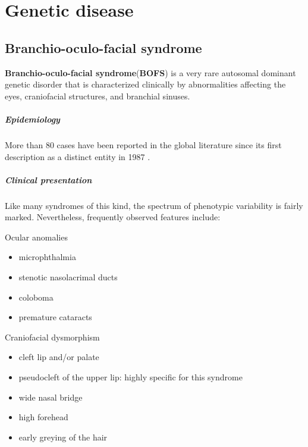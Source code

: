 \chapter{Genetic disease}
\section{Branchio-oculo-facial syndrome}

\textbf{Branchio-oculo-facial syndrome}(\textbf{BOFS}) is a very rare autosomal dominant genetic disorder that is characterized clinically by abnormalities affecting the eyes, craniofacial structures, and branchial sinuses.

\paragraph{Epidemiology}

More than 80 cases have been reported in the global literature since its first description as a distinct entity in 1987 .

\paragraph{Clinical presentation}

Like many syndromes of this kind, the spectrum of phenotypic variability is fairly marked. Nevertheless, frequently observed features include:

Ocular anomalies

\begin{itemize}
	\tightlist
	\item
	microphthalmia
	\item
	stenotic nasolacrimal ducts
	\item
	coloboma
	\item
	premature cataracts
\end{itemize}

Craniofacial dysmorphism

\begin{itemize}
	\tightlist
	\item
	cleft lip and/or palate
	\item
	pseudocleft of the upper lip: highly specific for this syndrome
	\item
	wide nasal bridge
	\item
	high forehead
	\item
	early greying of the hair
\end{itemize}

